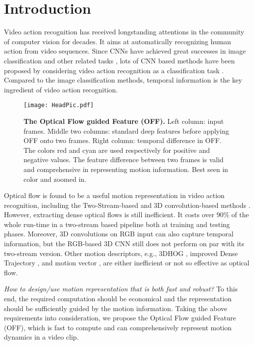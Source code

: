\documentclass[10pt,twocolumn,letterpaper]{article}
\begin{document}
\vspace{-12px}
\section{Introduction}
Video action recognition has received longstanding attentions in the community of computer vision for decades. It aims at automatically recognizing human action from video sequences. Since CNNs have achieved great successes in image classification and other related tasks \cite{krizhevsky2012imagenet,simonyan2014vgg,Szegedycvpr2015googlenet,he2016resnet,zeng2017crafting,Zhao_2017_CVPR,ouyang2016learning}, lots of CNN based methods have been proposed by considering video action recognition as a classification task \cite{carreira2017i3d, wang2016tsn, ng2016actionflownet, zhang2016motionvector, feichtenhofer2016spatiotemporal, diba2016tle, diba20163dtwostream, wang2015tdd, wang2015verydeep, sun2015human, simonyan2014two}. Compared to the image classification methods, temporal information is the key ingredient of video action recognition.

\begin{figure}[t]
\centering
\texttt{[image: HeadPic.pdf]}
\caption{\textbf{The Optical Flow guided Feature (OFF).} Left column: input frames. Middle two columns: standard deep features before applying OFF onto two frames. Right column: temporal difference in OFF. The colors red and cyan are used respectively for positive and negative values. The feature difference between two frames is valid and comprehensive in representing motion information. Best seen in color and zoomed in.}
\label{fig:headpic}
\end{figure}

Optical flow is found to be a useful motion representation in video action recognition, including the Two-Stream-based \cite{simonyan2014two, wang2016tsn} and 3D convolution-based methods \cite{carreira2017i3d}.
However, extracting dense optical flows is still inefficient. It costs over 90\% of the whole run-time in a two-stream based pipeline  both at training and testing phases.
Moreover, 3D convolutions on RGB input can also capture temporal information, but the RGB-based 3D CNN still does not perform on par with its two-stream version.
Other motion descriptors, e.g., 3DHOG \cite{Klaser2008}, improved Dense Trajectory \cite{wang2013idt}, and motion vector \cite{zhang2016motionvector}, are either inefficient or not so effective as optical flow.


\textit{How to design/use motion representation that is both fast and robust?} To this end, the required computation should be economical and the representation should be sufficiently guided by the motion information. Taking the above requirements into consideration, we propose the Optical Flow guided Feature (OFF), which is fast to compute and can comprehensively represent motion dynamics in a video clip.
\end{document}
